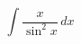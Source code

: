 \documentclass[../rgr1.tex]{subfiles}
\begin{document}
\Solution

\begin{equation}
	\int \frac{x}{ \sin^2 x} \, dx
\end{equation}

\Answer{
	<++>
}
\end{document}
